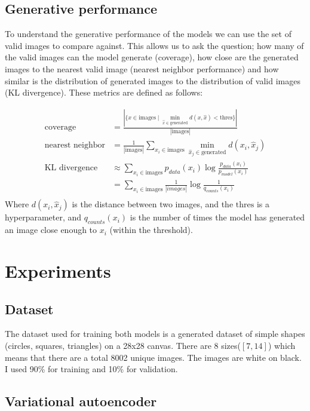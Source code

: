 \documentclass[conference,a4paper]{IEEEtran}
\begin{document}
\subsection{Generative performance}
To understand the generative performance of the models we can use the set of valid images to compare against. This allows us to ask the question; how many of the valid images can the model generate (coverage), how close are the generated images to the nearest valid image (nearest neighbor performance) and how similar is the distribution of generated images to the distribution of valid images (KL divergence). These metrics are defined as follows:

\begin{align*}
\text{coverage} &= \frac{|\{x \in \text{images} \mid \min_{\hat{x} \in \text{generated}} d(x, \hat{x}) < \text{thres}\}|}{|\text{images}|}\\
\text{nearest neighbor} &= \frac{1}{|\text{images}|} \sum_{x_i \in \text{images}} \min_{\hat{x}_j \in \text{generated}} d(x_i, \hat{x}_j)\\
\text{KL divergence} &\approx \sum_{x_i \in \text{images}} p_{data}(x_i) \log \frac{p_{data}(x_i)}{p_{model}(x_i)}\\
&= \sum_{x_i \in \text{images}} \frac{1}{|images|} \log \frac{1}{q_{counts}(x_i)}\\
\end{align*}
\noindent Where $d(x_i, \hat{x}_j)$ is the distance between two images, and the $\text{thres}$ is a hyperparameter, and $q_{counts}(x_i)$ is the number of times the model has generated an image close enough to $x_i$ (within the threshold).

\section{Experiments}

\subsection{Dataset}

The dataset used for training both models is a generated dataset of simple shapes (circles, squares, triangles) on a 28x28 canvas. There are 8 sizes($[7,14]$) which means that there are a total 8002 unique images. The images are white on black. I used 90\% for training and 10\% for validation.

\subsection{Variational autoencoder}
    
\end{document}
